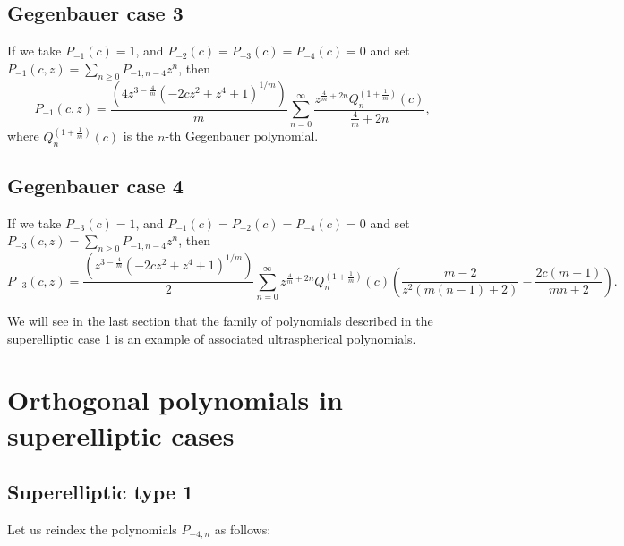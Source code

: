 \documentclass[review,nopreprintline]{elsarticle}
\theoremstyle{definition}
\numberwithin{equation}{section}
\theoremstyle{remark}
\begin{document}
	    \subsection{Gegenbauer case 3}
	        If we take $P_{-1}(c) = 1$, and $P_{-2}(c) = P_{-3}(c) = P_{-4}(c) = 0$ and set \\ $P_{-1}(c,z)=\sum_{n\geq0}P_{-1,n-4}z^n$, then
	        \begin{equation*}
	            P_{-1}(c,z)=\frac{\left(4 z^{3-\frac{4}{m}} \left(-2 c  z^2+z^4+1\right)^{1/m}\right)}{m} \sum_{n=0}^{\infty} \frac{z^{\frac{4}{m}+2n} Q_n^{\left(1+\frac{1}{m}\right)}(c)}{\frac{4}{m}+2 n},
	        \end{equation*}
	        where $Q_n^{\left(1+\frac{1}{m}\right)}(c)$ is the $n$-th Gegenbauer polynomial.
	
	    \subsection{Gegenbauer case 4}
	    If we take $P_{-3}(c) = 1$, and $P_{-1}(c) = P_{-2}(c) = P_{-4}(c) = 0$ and set $P_{-3}(c,z)=\sum_{n\geq0}P_{-1,n-4}z^n$,
	then
	    \begin{equation*}
	        P_{-3}(c,z)=\frac{\left(z^{3-\frac{4}{m}} \left(-2 c z^2+z^4+1\right)^{1/m}\right)}{2} \sum _{n=0}^{\infty }   z^{\frac{4}{m}+2 n} Q_n^{\left(1+\frac{1}{m}\right)}(c) \left(\frac{m-2}{z^2 (m (n-1)+2)}-\frac{2 c (m-1)}{m n+2}\right).
	    \end{equation*}
	
	
	
	    We will see in the last section that the family of polynomials described in the superelliptic case 1 is an example of associated ultraspherical polynomials.
	    
	    
	    
	    
	    
	    \section{Orthogonal polynomials in superelliptic cases}
	    
	  
	    \subsection{Superelliptic type 1}
	        Let us reindex the polynomials $P_{-4,n}$ as follows:
	    
\end{document}

